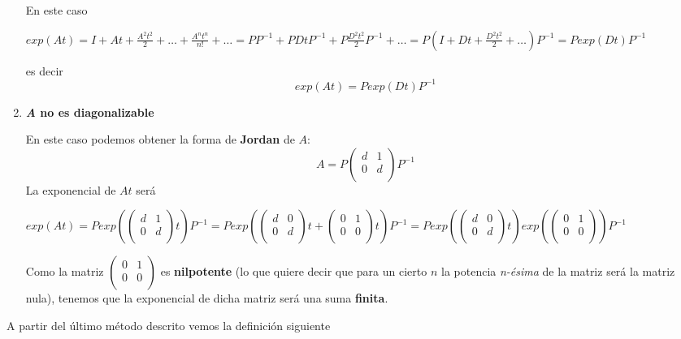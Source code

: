 \begin{enumerate}
En este caso
\begin{center}
$exp(At) = I + At + \frac{A^2t^2}{2} + \hdots +\frac{A^nt^n}{n!} + \hdots =PP^{-1} + PDtP^{-1} + P\frac{D^2t^2}{2}P^{-1} + \hdots = P(I+Dt+\frac{D^2t^2}{2}+\hdots)P^{-1} = Pexp(Dt)P^{-1}$
\end{center}
es decir
$$exp(At) = Pexp(Dt)P^{-1}$$

\item \textbf{\textit{A} no es diagonalizable}

En este caso podemos obtener la forma de \textbf{Jordan} de $A$:
$$A = P\begin{pmatrix}
d & 1\\0 & d\\
\end{pmatrix}P^{-1}$$
La exponencial de $At$ será
\begin{center}
$exp(At) = Pexp({\begin{pmatrix}
d & 1\\0 & d\\
\end{pmatrix}t})P^{-1} = Pexp({\begin{pmatrix}
d & 0\\0 & d\\
\end{pmatrix}t + \begin{pmatrix}
0 & 1\\ 0 & 0\\
\end{pmatrix}}t)P^{-1} = Pexp(\begin{pmatrix}
d & 0\\ 0 & d\\
\end{pmatrix}t)exp(\begin{pmatrix}
0 & 1\\ 0 & 0\\
\end{pmatrix})P^{-1}$
\end{center}
Como la matriz $\begin{pmatrix}
0 & 1\\ 0 & 0\\
\end{pmatrix}$ es \textbf{nilpotente} (lo que quiere decir que para un cierto $n$ la potencia \textit{n-ésima} de la matriz será la matriz nula), tenemos que la exponencial de dicha matriz será una suma \textbf{finita}.
\end{enumerate}

A partir del último método descrito vemos la definición siguiente

